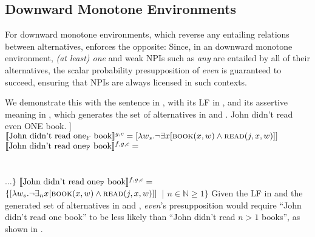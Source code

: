 \subsection{Downward Monotone Environments}
For downward monotone environments, which reverse any entailing relations between alternatives,  enforces the opposite: Since, in an downward monotone environment, \textit{(at least) one} and weak NPIs such as \textit{any} are entailed by all of their alternatives, the scalar probability presupposition of \textit{even} is guaranteed to succeed, ensuring that NPIs are always licensed in such contexts.

We demonstrate this with the sentence in , with its LF in , and its assertive meaning in , which generates the set of alternatives in  and .
\pex
\a John didn't read even \MakeUppercase{one} book.
\a[] [even\textsubscript{C} [not [John read one\textsubscript{F} book]]
\a $\intension[g,c]{John didn't read one\textsubscript{F} book}=[\lambda{w_s}.\neg\exists{x}[\predicate{book}(x,w)\land\predicate{read}(j,x,w)]]$
\a $\intension[f,g,c]{John didn't read one\textsubscript{F} book}=$\\
\\
\\
$\ldots\}$
\a $\intension[f,g,c]{John didn't read one\textsubscript{F} book}=$\\\emptyfill$\{[\lambda{w_s}.\neg\exists_n{x}[\predicate{book}(x,w)\land\predicate{read}(j,x,w)]]$~| $n\in\mathbb{N}\geqslant1\}$
\xe
Given the LF in  and the generated set of alternatives in  and , \textit{even}'s presupposition would require \enquote{John didn't read one book} to be less likely than \enquote{John didn't read $n>1$ books}, as shown in .
